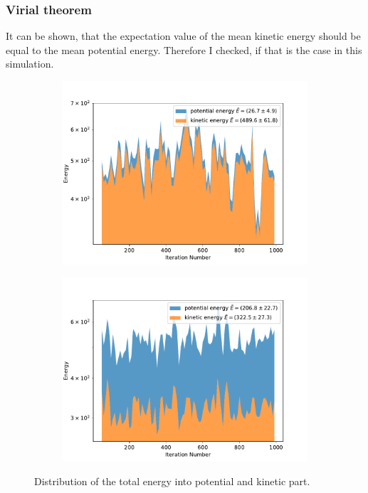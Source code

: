 \documentclass{scrartcl}
\begin{document}
	\subsubsection{Virial theorem}
		It can be shown, that the expectation value of the mean kinetic energy should be equal to the mean potential energy.
		Therefore I checked, if that is the case in this simulation.
		\begin{figure}[H]
			\centering
				\begin{subfigure}[c]{0.49\textwidth}
					\includegraphics[width=\textwidth]{../imgs/harmonic_oscillator_track/track_1000100_heavy_virial_log.pdf}
					\label{fig:track_1000100_heavy_virial_log}
				\end{subfigure}
				\begin{subfigure}[c]{0.49\textwidth}
					\includegraphics[width=\textwidth]{../imgs/harmonic_oscillator_track/track_1000100_virial_log.pdf}
					\label{fig:track_1000100_virial_log}
				\end{subfigure}
			\caption{Distribution of the total energy into potential and kinetic part.}
			\label{fig:track_1000100_virial}
		\end{figure}
\end{document}
